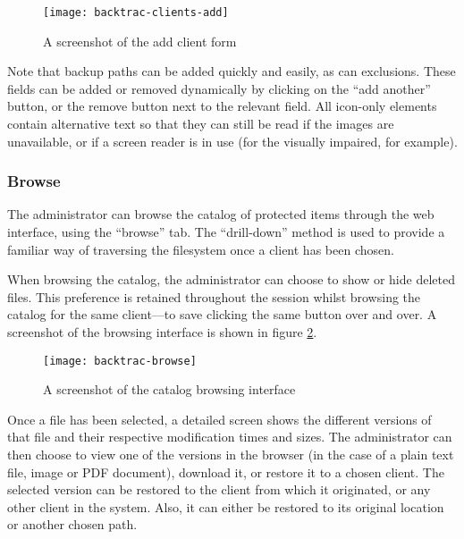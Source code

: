 \begin{figure}[h]
    \begin{center}
        \texttt{[image: backtrac-clients-add]}
    \end{center}
    \caption{A screenshot of the add client form}
    \label{fig:backtrac-clients-add}
\end{figure}

Note that backup paths can be added quickly and easily, as can exclusions.
These fields can be added or removed dynamically by clicking on the ``add
another'' button, or the remove button next to the relevant field. All
icon-only elements contain alternative text so that they can still be read if
the images are unavailable, or if a screen reader is in use (for the visually
impaired, for example).

\subsubsection{Browse}
\label{sec:implementation-web-browse}

The administrator can browse the catalog of protected items through the web
interface, using the ``browse'' tab. The ``drill-down'' method is used to
provide a familiar way of traversing the filesystem once a client has been
chosen.

When browsing the catalog, the administrator can choose to show or hide deleted
files. This preference is retained throughout the session whilst browsing the
catalog for the same client---to save clicking the same button over and over.
A screenshot of the browsing interface is shown in figure
\ref{fig:backtrac-browse}.

\begin{figure}[h]
    \begin{center}
        \texttt{[image: backtrac-browse]}
    \end{center}
    \caption{A screenshot of the catalog browsing interface}
    \label{fig:backtrac-browse}
\end{figure}

Once a file has been selected, a detailed screen shows the different versions
of that file and their respective modification times and sizes. The
administrator can then choose to view one of the versions in the browser (in
the case of a plain text file, image or PDF document), download it, or restore
it to a chosen client. The selected version can be restored to the client from
which it originated, or any other client in the system. Also, it can either be
restored to its original location or another chosen path.


